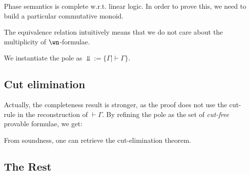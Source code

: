 Phase semantics is complete w.r.t. linear logic. In order to prove this,
we need to build a particular commutative monoid.

The equivalence relation intuitively means that we do not care about the
multiplicity of \(\wn\)-formulae.

We instantiate the pole as \(\Bot := \{\Gamma \mid \vdash\Gamma\}\).

\subsection{Cut elimination}\label{cut-elimination}

Actually, the completeness result is stronger, as the proof does not use
the cut-rule in the reconstruction of \(\vdash\Gamma\). By refining the
pole as the set of \emph{cut-free} provable formulae, we get:

From soundness, one can retrieve the cut-elimination theorem.

\subsection{The Rest}\label{the-rest}

